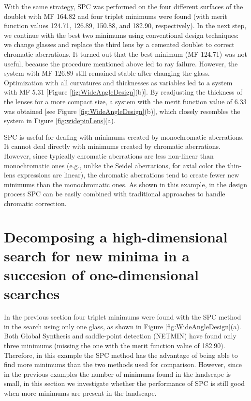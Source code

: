 With the same strategy, SPC was performed on the four different surfaces of the doublet with MF 164.82 and four triplet minimums were found (with merit function values 124.71, 126.89, 150.88, and 182.90, respectively). In the next step, we continue with the best two minimums using conventional design techniques: we change glasses and replace the third lens by a cemented doublet to correct chromatic aberrations. It turned out that the best minimum (MF 124.71) was not useful, because the procedure mentioned above led to ray failure. However, the system with MF 126.89 still remained stable after changing the glass. Optimization with all curvatures and thicknesses as variables led to a system with MF 5.31 [Figure \ref{fig:WideAngleDesign}(b)]. By readjusting the thickness of the lenses for a more compact size, a system with the merit function value of 6.33 was obtained [see Figure \ref{fig:WideAngleDesign}(b)], which closely resembles the system in Figure \ref{fig:widepinLens}(a).

SPC is useful for dealing with minimums created by monochromatic aberrations. It cannot deal directly with minimums created by chromatic aberrations. However, since typically chromatic aberrations are less non-linear than monochromatic ones (e.g., unlike the Seidel aberrations, for axial color the thin-lens expressions are linear), the chromatic aberrations tend to create fewer new minimums than the monochromatic
ones. As shown in this example, in the design process SPC can be easily combined with traditional approaches to handle chromatic correction.


\section{Decomposing a high-dimensional search for new minima in a succesion of one-dimensional searches}

In the previous section four triplet minimums were found with the SPC method in the search using only one glass, as shown in Figure \ref{fig:WideAngleDesign}(a). Both Global Synthesis and saddle-point detection
(NETMIN) have found only three minimums (missing the one with the merit function value of 182.90). Therefore, in this example the SPC method has the advantage of being able to find more minimums than the two methods used for comparison. However, since in the previous examples the number of minimums found in the landscape is small, in this section we investigate whether the performance of SPC is still good when more minimums are present in the landscape.

